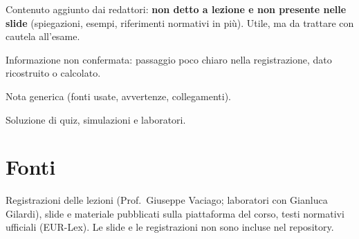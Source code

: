 \begin{integrazione}
Contenuto aggiunto dai redattori: \textbf{non detto a lezione e non presente nelle slide}
(spiegazioni, esempi, riferimenti normativi in più). Utile, ma da trattare con cautela all'esame.
\end{integrazione}

\begin{verifica}
Informazione non confermata: passaggio poco chiaro nella registrazione, dato ricostruito o calcolato.
\end{verifica}

\begin{nota}
Nota generica (fonti usate, avvertenze, collegamenti).
\end{nota}

\begin{soluzione}
Soluzione di quiz, simulazioni e laboratori.
\end{soluzione}


\section*{Fonti}
Registrazioni delle lezioni (Prof.~Giuseppe Vaciago; laboratori con Gianluca Gilardi), slide e materiale
pubblicati sulla piattaforma del corso, testi normativi ufficiali (EUR-Lex). Le slide e le
registrazioni non sono incluse nel repository.
